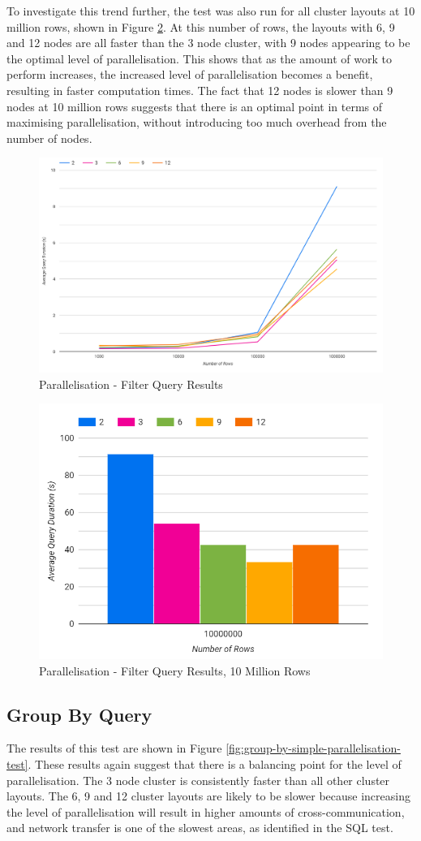 To investigate this trend further, the test was also run for all cluster layouts at 10 million rows, shown in Figure \ref{fig:filter-simple-parallelisation-10m}. At this number of rows, the layouts with 6, 9 and 12 nodes are all faster than the 3 node cluster, with 9 nodes appearing to be the optimal level of parallelisation. This shows that as the amount of work to perform increases, the increased level of parallelisation becomes a benefit, resulting in faster computation times. The fact that 12 nodes is slower than 9 nodes at 10 million rows suggests that there is an optimal point in terms of maximising parallelisation, without introducing too much overhead from the number of nodes.

\begin{figure}[ht]
	\centering
	\includegraphics[width=0.8\linewidth]{chapters/diagrams/testing/filter-simple-parallelisation-test}
	\caption{Parallelisation - Filter Query Results}
	\label{fig:filter-simple-parallelisation-test}
\end{figure}

\begin{figure}[ht]
	\centering
	\includegraphics[width=0.4\linewidth]{chapters/diagrams/testing/filter-simple-parallelisation-10m}
	\caption{Parallelisation - Filter Query Results, 10 Million Rows}
	\label{fig:filter-simple-parallelisation-10m}
\end{figure}

\subsection{Group By Query}
The results of this test are shown in Figure \ref{fig:group-by-simple-parallelisation-test}. These results again suggest that there is a balancing point for the level of parallelisation. The 3 node cluster is consistently faster than all other cluster layouts. The 6, 9 and 12 cluster layouts are likely to be slower because increasing the level of parallelisation will result in higher amounts of cross-communication, and network transfer is one of the slowest areas, as identified in the SQL test.

